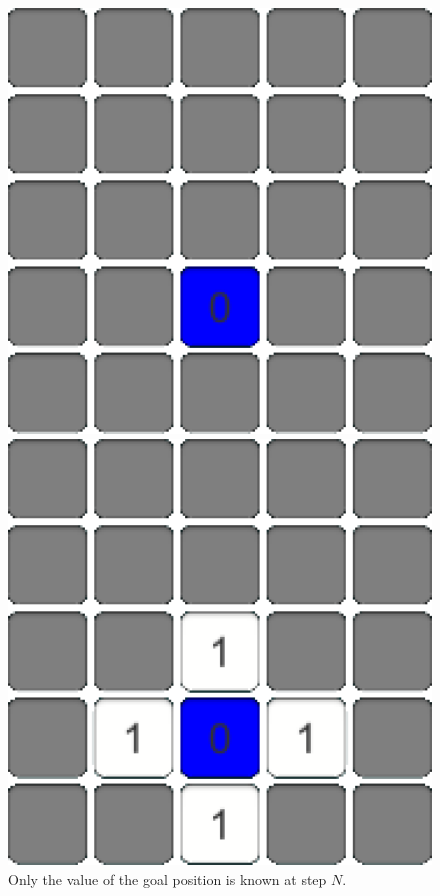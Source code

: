 \documentclass[conference]{IEEEtran}
\begin{document}
\begin{figure}[h]
\centering
\begin{minipage}[t]{0.3\linewidth}
\centering
\includegraphics[width=1\textwidth]{images/ValueFunction/01.png}
\caption{Only the value of the goal position is known at step $N$.}
\end{minipage}
\hfill
\begin{minipage}[t]{0.3\linewidth}
\centering
\includegraphics[width=1\textwidth]{images/ValueFunction/02.png}

\end{minipage}
\end{figure}
\end{document}
